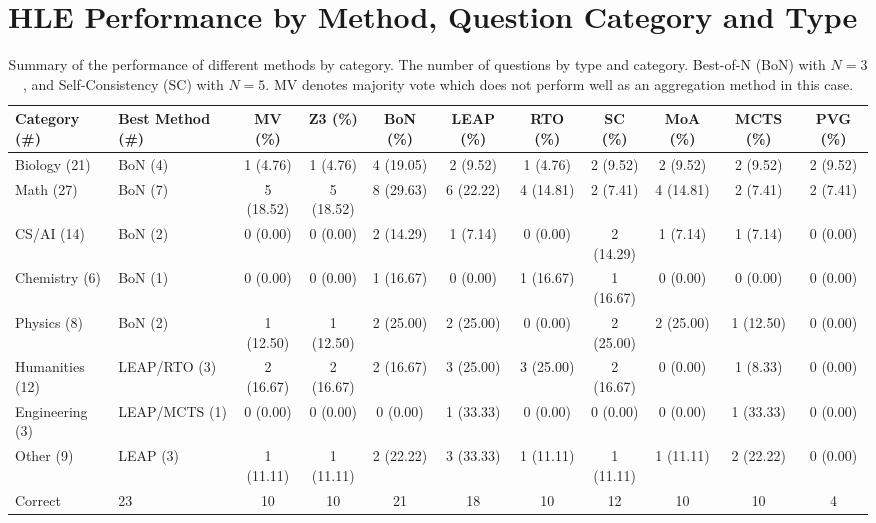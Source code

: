 \section{HLE Performance by Method, Question Category and Type}
\label{appendix:U}

\begin{table}[ht]
\centering
\tiny
\caption{Summary of the performance of different methods by category. The number of questions by type and category. Best-of-N (BoN) with $N = 3$, and Self-Consistency (SC) with $N = 5$. MV denotes majority vote which does not perform well as an aggregation method in this case.}
\begin{tabular}{llccccccccc}
\toprule
\textbf{Category (\#)} &
\textbf{Best Method (\#)} &
\textbf{MV (\%)} &
\textbf{Z3 (\%)} &
\textbf{BoN (\%)} &
\textbf{LEAP (\%)} &
\textbf{RTO (\%)} &
\textbf{SC (\%)} &
\textbf{MoA (\%)} &
\textbf{MCTS (\%)} &
\textbf{PVG} (\%) \\
\midrule

Biology (21) & BoN (4) & 1 (4.76) & 1 (4.76) & 4 (19.05) & 2 (9.52) & 1 (4.76) & 2 (9.52) & 2 (9.52) & 2 (9.52) & 2 (9.52) \\

Math (27) & BoN (7) & 5 (18.52) & 5 (18.52) & 8 (29.63) & 6 (22.22) & 4 (14.81) & 2 (7.41) & 4 (14.81) & 2 (7.41) & 2 (7.41) \\

CS/AI (14) & BoN (2) & 0 (0.00) & 0 (0.00) & 2 (14.29) & 1 (7.14) & 0 (0.00) & 2 (14.29) & 1 (7.14) & 1 (7.14) & 0 (0.00) \\

Chemistry (6) & BoN (1) & 0 (0.00) & 0 (0.00) & 1 (16.67) & 0 (0.00) & 1 (16.67) & 1 (16.67) & 0 (0.00) & 0 (0.00) & 0 (0.00) \\

Physics (8) & BoN (2) & 1 (12.50) & 1 (12.50) & 2 (25.00) & 2 (25.00) & 0 (0.00) & 2 (25.00) & 2 (25.00) & 1 (12.50) & 0 (0.00) \\

Humanities (12) & LEAP/RTO (3) & 2 (16.67) & 2 (16.67) & 2 (16.67) & 3 (25.00) & 3 (25.00) & 2 (16.67) & 0 (0.00) & 1 (8.33) & 0 (0.00) \\

Engineering (3) & LEAP/MCTS (1) & 0 (0.00) & 0 (0.00) & 0 (0.00) & 1 (33.33) & 0 (0.00) & 0 (0.00) & 0 (0.00) & 1 (33.33) & 0 (0.00) \\

Other (9) & LEAP (3) & 1 (11.11) & 1 (11.11) & 2 (22.22) & 3 (33.33) & 1 (11.11) & 1 (11.11) & 1 (11.11) & 2 (22.22) & 0 (0.00) \\

\midrule
Correct & 23 & 10 & 10 & 21 & 18 & 10 & 12 & 10 & 10 & 4 \\
\bottomrule
\end{tabular}
\label{tab:category-method}
\end{table}



